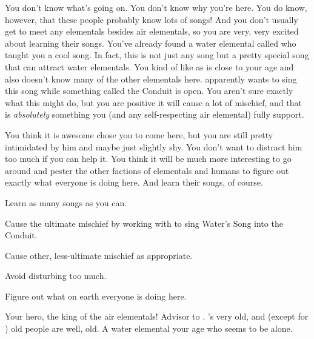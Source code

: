 \documentclass[char]{elementals}
\begin{document}
You don't know what's going on. You don't know why you're here. You do know, however, that these people probably know lots of songs! And you don't usually get to meet any elementals besides air elementals, so you are very, very excited about learning their songs. You've already found a water elemental called \cMiniWater{\intro} who taught you a cool song. In fact, this is not just any song but a pretty special song that can attract water elementals. You kind of like \cMiniWater{} as \cMiniWater{\they} is close to your age and also doesn't know many of the other elementals here. \cMiniWater{\They} apparently wants to sing this song while something called the Conduit is open. You aren't sure exactly what this might do, but you are positive it will cause a lot of mischief, and that is \emph{absolutely} something you (and any self-respecting air elemental) fully support.

You think it is awesome \cKing{} chose you to come here, but you are still pretty intimidated by him and maybe just slightly shy. You don't want to distract him too much if you can help it. You think it will be much more interesting to go around and pester the other factions of elementals and humans to figure out exactly what everyone is doing here. And learn their songs, of course.

\begin{itemz}[Goals]
	\item  Learn as many songs as you can.
	\item  Cause the ultimate mischief by working with \cMiniWater{} to sing Water's Song into the Conduit.
	\item  Cause other, less-ultimate mischief as appropriate.
	\item  Avoid disturbing \cKing{} too much.
	\item  Figure out what on earth everyone is doing here.
\end{itemz}

\begin{contacts}
	\contact{\cKing{\intro}} Your hero, the king of the air elementals!
	\contact{\cNaturalist{\intro}} Advisor to \cKing{}. \cNaturalist{\They}'s very old, and (except for \cKing{}) old people are well, old.
	\contact{\cMiniWater{\intro}} A water elemental your age who seems to be alone.
\end{contacts} 
\end{document}
